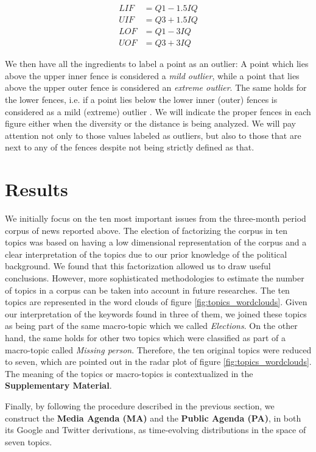 \documentclass{bmcart}
\begin{document}
\begin{eqnarray}\label{eq:fences}
LIF & = Q1 - 1.5 IQ \nonumber \\
UIF & = Q3 + 1.5 IQ \nonumber\\
LOF & = Q1 - 3 IQ \nonumber \\
UOF & = Q3 + 3 IQ
\end{eqnarray}
\par We then have all the ingredients to label a point as an outlier: A point which lies above the upper inner fence is considered a \emph{mild outlier}, while a point that lies above the upper outer fence is considered an \emph{extreme outlier}. The same holds for the lower fences, i.e. if a point lies below the lower inner (outer) fences is considered as a mild (extreme) outlier \cite{natrella2010nist}. 
We will indicate the proper fences in each figure either when the diversity or the distance is being analyzed. We will pay attention not only to those values labeled as outliers, but also to those that are next to any of the fences despite not being strictly defined as that.

\section*{Results}
\label{results}

\par We initially focus on the ten most important issues from the three-month period corpus of news reported above. 
The election of factorizing the corpus in ten topics was based on having a low dimensional representation of the corpus and a clear interpretation of the topics due to our prior knowledge of the political background. 
We found that this factorization allowed us to draw useful conclusions. However, more sophisticated methodologies to estimate the number of topics in a corpus can be taken into account in future researches.
The ten topics are represented in the word clouds of figure \ref{fig:topics_wordclouds}.
Given our interpretation of the keywords found in three of them, we joined these topics as being part of the same macro-topic which we called \emph{Elections}.
On the other hand, the same holds for other two topics which were classified as part of a macro-topic called \emph{Missing person}. 
Therefore, the ten original topics were reduced to seven, which are pointed out in the radar plot of figure \ref{fig:topics_wordclouds}.
The meaning of the topics or macro-topics is contextualized in the \textbf{Supplementary Material}.
\par Finally, by following the procedure described in the previous section, we construct the \textbf{Media Agenda (MA)} and the \textbf{Public Agenda (PA)}, in both its Google and Twitter derivations, as time-evolving distributions in the space of seven topics.
\end{document}
